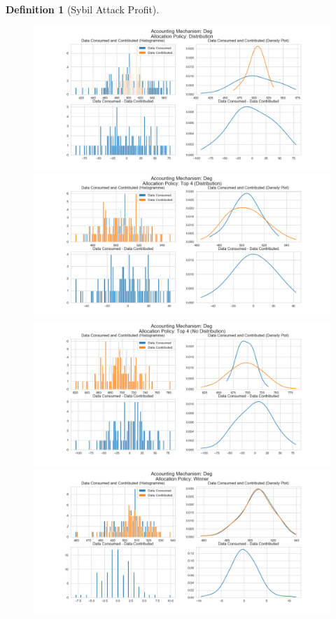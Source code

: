 \documentclass[11pt,a4paper]{article}
\theoremstyle{definition}
\newtheorem{definition}{Definition}[section]
\theoremstyle{theorem}
\theoremstyle{proposition}
\theoremstyle{corollary}
\theoremstyle{lemma}
\theoremstyle{example}
\theoremstyle{remark}
\begin{document}
\begin{definition}[Sybil Attack Profit]
\begin{figure}[H]
\begin{center}
\includegraphics[scale=0.4]{Acc_Deg_Dist.png}
\includegraphics[scale=0.4]{Acc_Deg_Top_4_Dist.png}
\includegraphics[scale=0.4]{Acc_Deg_Top_4_No_Dist.png}
\includegraphics[scale=0.4]{Acc_Deg_Winner.png}
\end{center}
\end{figure}


\end{definition}
\end{document}
